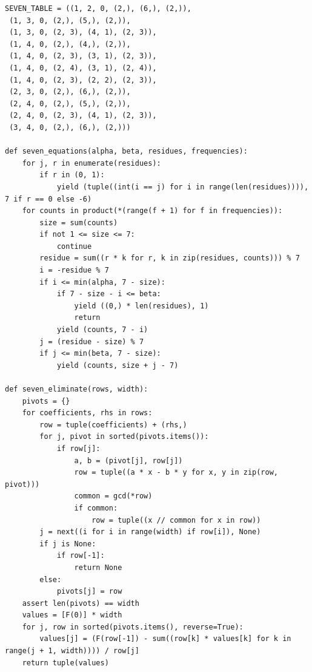 \documentclass[11pt,a4paper]{article}
\theoremstyle{definition}
\numberwithin{equation}{section}
\begin{document}
\begin{Verbatim}[fontsize=\scriptsize]
SEVEN_TABLE = ((1, 2, 0, (2,), (6,), (2,)),
 (1, 3, 0, (2,), (5,), (2,)),
 (1, 3, 0, (2, 3), (4, 1), (2, 3)),
 (1, 4, 0, (2,), (4,), (2,)),
 (1, 4, 0, (2, 3), (3, 1), (2, 3)),
 (1, 4, 0, (2, 4), (3, 1), (2, 4)),
 (1, 4, 0, (2, 3), (2, 2), (2, 3)),
 (2, 3, 0, (2,), (6,), (2,)),
 (2, 4, 0, (2,), (5,), (2,)),
 (2, 4, 0, (2, 3), (4, 1), (2, 3)),
 (3, 4, 0, (2,), (6,), (2,)))

def seven_equations(alpha, beta, residues, frequencies):
    for j, r in enumerate(residues):
        if r in (0, 1):
            yield (tuple((int(i == j) for i in range(len(residues)))), 7 if r == 0 else -6)
    for counts in product(*(range(f + 1) for f in frequencies)):
        size = sum(counts)
        if not 1 <= size <= 7:
            continue
        residue = sum((r * k for r, k in zip(residues, counts))) % 7
        i = -residue % 7
        if i <= min(alpha, 7 - size):
            if 7 - size - i <= beta:
                yield ((0,) * len(residues), 1)
                return
            yield (counts, 7 - i)
        j = (residue - size) % 7
        if j <= min(beta, 7 - size):
            yield (counts, size + j - 7)

def seven_eliminate(rows, width):
    pivots = {}
    for coefficients, rhs in rows:
        row = tuple(coefficients) + (rhs,)
        for j, pivot in sorted(pivots.items()):
            if row[j]:
                a, b = (pivot[j], row[j])
                row = tuple((a * x - b * y for x, y in zip(row, pivot)))
                common = gcd(*row)
                if common:
                    row = tuple((x // common for x in row))
        j = next((i for i in range(width) if row[i]), None)
        if j is None:
            if row[-1]:
                return None
        else:
            pivots[j] = row
    assert len(pivots) == width
    values = [F(0)] * width
    for j, row in sorted(pivots.items(), reverse=True):
        values[j] = (F(row[-1]) - sum((row[k] * values[k] for k in range(j + 1, width)))) / row[j]
    return tuple(values)


\end{Verbatim}
\end{document}
